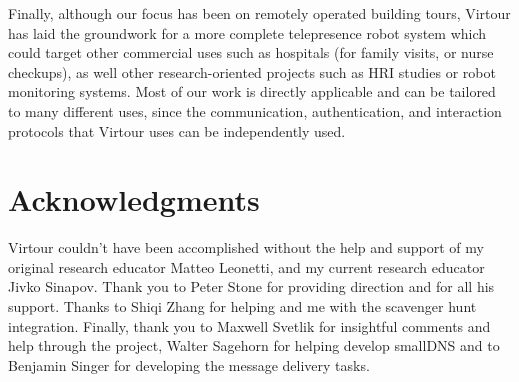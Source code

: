 \documentclass[
  oneside,
  11pt, a4paper,
  footinclude=true,
  headinclude=true,
  cleardoublepage=empty
]{article}
\begin{document}
Finally, although our focus has been on remotely operated building tours,
Virtour has laid the groundwork for a more complete telepresence robot system
which could target other commercial uses such as hospitals (for family visits,
or nurse checkups), as well other research-oriented projects such as HRI
studies or robot monitoring systems. Most of our work is directly applicable
and can be tailored to many different uses, since the communication,
authentication, and interaction protocols that Virtour uses can be independently
used.

\section{Acknowledgments}\label{sec:acks}

Virtour couldn't have been accomplished without the help and support of my
original research educator Matteo Leonetti, and my current research educator
Jivko Sinapov. Thank you to Peter Stone for providing direction and for all his
support. Thanks to Shiqi Zhang for helping and me with the scavenger hunt
integration. Finally, thank you to Maxwell Svetlik for insightful comments and
help through the project, Walter Sagehorn for helping develop smallDNS and to
Benjamin Singer for developing the message delivery tasks.

\nocite{*}


    
\end{document}

